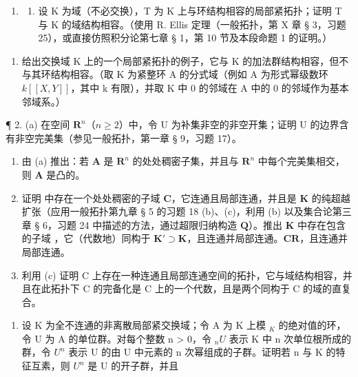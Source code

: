 
\begin{enumerate}
\def\labelenumi{\arabic{enumi}.}
\tightlist
\item
  \begin{enumerate}
  \def\labelenumii{(\alph{enumii})}
  \tightlist
  \item
    设 K 为域（不必交换），T 为 K 上与环结构相容的局部紧拓扑；证明 T 与 K 的域结构相容。（使用 R. Ellis 定理（一般拓扑，第 X 章 § 3，习题 25），或直接仿照积分论第七章 § 1，第 10 节及本段命题 1 的证明。）
  \end{enumerate}
\end{enumerate}

\begin{enumerate}
\def\labelenumi{(\alph{enumi})}
\setcounter{enumi}{1}
\tightlist
\item
  给出交换域 K 上的一个局部紧拓扑的例子，它与 K 的加法群结构相容，但不与其环结构相容。（取 K 为紧整环 A 的分式域（例如 A 为形式幂级数环 \(k[[X, Y]]\)，其中 k 有限），并取 K 中 0 的邻域在 A 中的 0 的邻域作为基本邻域系。）
\end{enumerate}

¶ 2. (a) 在空间 \(\mathbf{R}^n\)（\(n \geqslant 2\)）中，令 U 为补集非空的非空开集；证明 U 的边界含有非空完美集（参见一般拓扑，第一章 § 9，习题 17）。

\begin{enumerate}
\def\labelenumi{(\alph{enumi})}
\setcounter{enumi}{1}
\item
  由 (a) 推出：若 \(\mathbf{A}\) 是 \(\mathbf{R}^n\) 的处处稠密子集，并且与 \(\mathbf{R}^n\) 中每个完美集相交，则 \(\mathbf{A}\) 是凸的。
\item
  证明  中存在一个处处稠密的子域 \(\mathbf{C}\)，它连通且局部连通，并且是 \(\mathbf{K}\) 的纯超越扩张（应用一般拓扑第九章 § 5 的习题 18 (b)、(c)，利用 (b) 以及集合论第三章 § 6，习题 24 中描述的方法，通过超限归纳构造 \(\mathbf{Q}\)）。推出 \(\mathbf{K}\) 中存在包含  的子域 ，它（代数地）同构于 \(\mathbf{K}' \supset \mathbf{K}\)，且连通并局部连通。\(\mathbf{C}\)\(\mathbf{R}\)，且连通并局部连通。
\item
  利用 (c) 证明 C 上存在一种连通且局部连通空间的拓扑，它与域结构相容，并且在此拓扑下 C 的完备化是 C 上的一个代数，且是两个同构于 C 的域的直复合。
\end{enumerate}

\begin{enumerate}
\def\labelenumi{\arabic{enumi}.}
\setcounter{enumi}{2}
\tightlist
\item
  设 K 为全不连通的非离散局部紧交换域；令 A 为 K 上模 \(_{K}\) 的绝对值的环，令 U 为 A 的单位群。对每个整数 n \textgreater{} 0，令 \(_{n}U\) 表示 K 中 n 次单位根所成的群，令 \(U^{n}\) 表示 U 的由 U 中元素的 n 次幂组成的子群。证明若 n 与 K 的特征互素，则 \(U^{n}\) 是 U 的开子群，并且
\end{enumerate}

